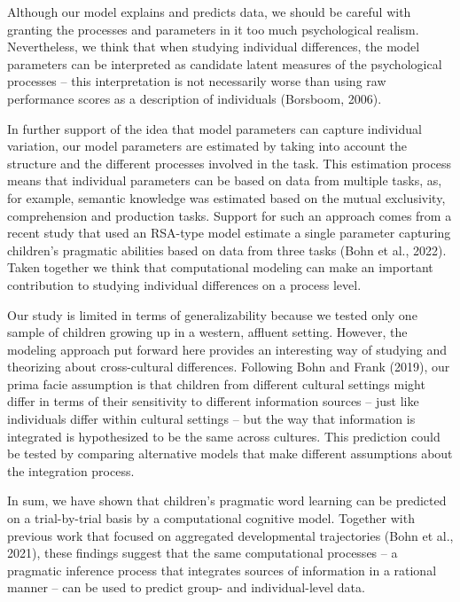 \documentclass[
  man,floatsintext]{apa6}
\begin{document}
Although our model explains and predicts data, we should be careful with granting the processes and parameters in it too much psychological realism. Nevertheless, we think that when studying individual differences, the model parameters can be interpreted as candidate latent measures of the psychological processes -- this interpretation is not necessarily worse than using raw performance scores as a description of individuals (Borsboom, 2006).

In further support of the idea that model parameters can capture individual variation, our model parameters are estimated by taking into account the structure and the different processes involved in the task. This estimation process means that individual parameters can be based on data from multiple tasks, as, for example, semantic knowledge was estimated based on the mutual exclusivity, comprehension and production tasks. Support for such an approach comes from a recent study that used an RSA-type model estimate a single parameter capturing children's pragmatic abilities based on data from three tasks (Bohn et al., 2022). Taken together we think that computational modeling can make an important contribution to studying individual differences on a process level.

Our study is limited in terms of generalizability because we tested only one sample of children growing up in a western, affluent setting. However, the modeling approach put forward here provides an interesting way of studying and theorizing about cross-cultural differences. Following Bohn and Frank (2019), our prima facie assumption is that children from different cultural settings might differ in terms of their sensitivity to different information sources -- just like individuals differ within cultural settings -- but the way that information is integrated is hypothesized to be the same across cultures. This prediction could be tested by comparing alternative models that make different assumptions about the integration process.

In sum, we have shown that children's pragmatic word learning can be predicted on a trial-by-trial basis by a computational cognitive model. Together with previous work that focused on aggregated developmental trajectories (Bohn et al., 2021), these findings suggest that the same computational processes -- a pragmatic inference process that integrates sources of information in a rational manner -- can be used to predict group- and individual-level data.

\newpage
\end{document}
